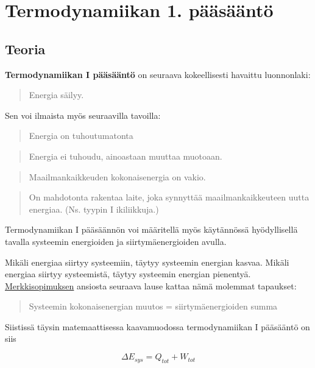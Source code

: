 \documentclass[12pt,a4paper,finnish]{book}
\begin{document}
\chapter{Termodynamiikan 1. pääsääntö} \label{def:td1} %

\section{Teoria} %

\textbf{Termodynamiikan I pääsääntö} on seuraava kokeellisesti havaittu luonnonlaki:

\begin{quote}
 Energia säilyy.
\end{quote}

Sen voi ilmaista myös seuraavilla tavoilla:

\begin{quote}
 Energia on tuhoutumatonta
\end{quote}

\begin{quote}
 Energia ei tuhoudu, ainoastaan muuttaa muotoaan.
\end{quote}

\begin{quote}
 Maailmankaikkeuden kokonaisenergia on vakio.
\end{quote}

\begin{quote}
 On mahdotonta rakentaa laite, joka synnyttää maailmankaikkeuteen uutta energiaa. (Ns. tyypin I ikiliikkuja.)
\end{quote}

Termodynamiikan I pääsäännön voi määritellä myös käytännössä hyödyllisellä tavalla 
systeemin energioiden ja siirtymäenergioiden avulla. 

Mikäli energiaa siirtyy systeemiin, 
täytyy systeemin energian kasvaa. Mikäli energiaa siirtyy systeemistä, täytyy systeemin 
energian pienentyä. \hyperref[sec:merkkisopimus]{Merkkisopimuksen} ansiosta seuraava 
lause kattaa nämä molemmat tapaukset:

\begin{quote}
 Systeemin kokonaisenergian muutos = siirtymäenergioiden summa
\end{quote}

Siistissä täysin matemaattisessa kaavamuodossa termodynamiikan I pääsääntö on siis

\begin{equation}
 \Delta E_{sys} = Q_{tot} + W_{tot}
\end{equation}
\end{document}
